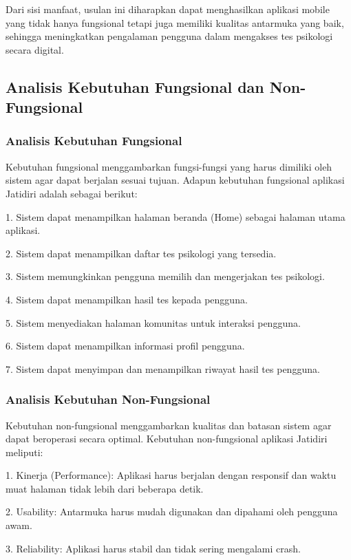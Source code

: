 Dari sisi manfaat, usulan ini diharapkan dapat menghasilkan aplikasi mobile yang tidak hanya fungsional tetapi juga memiliki kualitas antarmuka yang baik, sehingga meningkatkan pengalaman pengguna dalam mengakses tes psikologi secara digital.


\subsection{Analisis Kebutuhan Fungsional dan Non-Fungsional}

\subsubsection{Analisis Kebutuhan Fungsional}

Kebutuhan fungsional menggambarkan fungsi-fungsi yang harus dimiliki oleh sistem agar dapat berjalan sesuai tujuan. Adapun kebutuhan fungsional aplikasi Jatidiri adalah sebagai berikut:

1. Sistem dapat menampilkan halaman beranda (Home) sebagai halaman utama aplikasi.

2. Sistem dapat menampilkan daftar tes psikologi yang tersedia.

3. Sistem memungkinkan pengguna memilih dan mengerjakan tes psikologi.

4. Sistem dapat menampilkan hasil tes kepada pengguna.

5. Sistem menyediakan halaman komunitas untuk interaksi pengguna.

6. Sistem dapat menampilkan informasi profil pengguna.

7. Sistem dapat menyimpan dan menampilkan riwayat hasil tes pengguna.


\subsubsection{Analisis Kebutuhan Non-Fungsional}

Kebutuhan non-fungsional menggambarkan kualitas dan batasan sistem agar dapat beroperasi secara optimal. Kebutuhan non-fungsional aplikasi Jatidiri meliputi:

1. Kinerja (Performance): Aplikasi harus berjalan dengan responsif dan waktu muat halaman tidak lebih dari beberapa detik.

2. Usability: Antarmuka harus mudah digunakan dan dipahami oleh pengguna awam.

3. Reliability: Aplikasi harus stabil dan tidak sering mengalami crash.

